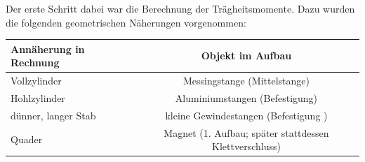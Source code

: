 \documentclass[11pt]{scrartcl}
\begin{document}
Der erste Schritt dabei war die Berechnung der Tr\"agheitsmomente. Dazu wurden die folgenden geometrischen N\"aherungen vorgenommen:

\begin{tabular}[ht]{|l|c|}
  \hline
  Ann\"aherung in Rechnung & Objekt im Aufbau\\
  \hline\hline
	Vollzylinder & Messingstange (Mittelstange)\\
	Hohlzylinder & Aluminiumstangen (Befestigung)\\
	d\"unner, langer Stab & kleine Gewindestangen (Befestigung%
)\\
	Quader & Magnet (1. Aufbau; sp\"ater stattdessen Klettverschluss)\\
  \hline
\end{tabular}
\end{document}
